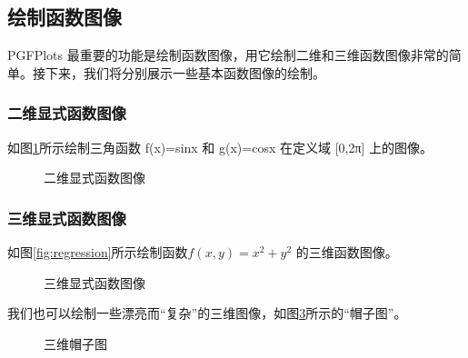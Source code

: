 \subsection{绘制函数图像}
PGFPlots 最重要的功能是绘制函数图像，用它绘制二维和三维函数图像非常的简单。接下来，我们将分别展示一些基本函数图像的绘制。
\subsubsection{二维显式函数图像}
如图\ref{fig:two}所示绘制三角函数 f(x)=sinx 和 g(x)=cosx 在定义域 [0,2π] 上的图像。

\begin{figure}[htb]
	\centering
	\caption{二维显式函数图像}
	\label{fig:two}
\end{figure}

\subsubsection{三维显式函数图像}
如图\ref{fig:regression}所示绘制函数$ f(x,y)=x^2+y^2$ 的三维函数图像。

\begin{figure}[htb]
	\centering
	\caption{三维显式函数图像}
	\label{fig:three}
\end{figure}
我们也可以绘制一些漂亮而“复杂”的三维图像，如图\ref{fig:hat}所示的“帽子图”。
\begin{figure}[htb]
	\centering
	\caption{三维帽子图}
	\label{fig:hat}
\end{figure}

